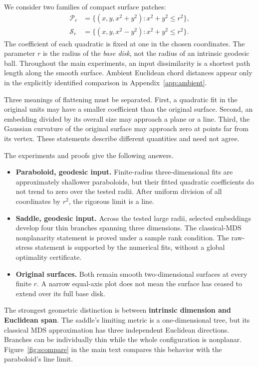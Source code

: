\documentclass[11pt]{article}
\theoremstyle{remark}\newtheorem{remark}[proposition]{Remark}
\begin{document}
We consider two families of compact surface patches:
\begin{align}
 \mathcal P_r&=\{(x,y,x^2+y^2):x^2+y^2\le r^2\},\\
 \mathcal S_r&=\{(x,y,x^2-y^2):x^2+y^2\le r^2\}.
\end{align}
The coefficient of each quadratic is fixed at one in the chosen coordinates.
The parameter $r$ is the radius of the \emph{base disk}, not the radius of an
intrinsic geodesic ball. Throughout the main experiments, an input
dissimilarity is a shortest path length along the smooth surface. Ambient
Euclidean chord distances appear only in the explicitly identified comparison
in Appendix~\ref{app:ambient}.

Three meanings of flattening must be separated. First, a quadratic fit in the
original units may have a smaller coefficient than the original surface.
Second, an embedding divided by its overall size may approach a plane or a
line. Third, the Gaussian curvature of the original surface may approach zero
at points far from its vertex. These statements describe different quantities
and need not agree.

The experiments and proofs give the following answers.
\begin{itemize}
 \item \textbf{Paraboloid, geodesic input.} Finite-radius three-dimensional
 fits are approximately shallower paraboloids, but their fitted quadratic
 coefficients do not trend to zero over the tested radii. After uniform
 division of all coordinates by $r^2$, the rigorous limit is a line.
 \item \textbf{Saddle, geodesic input.} Across the tested large radii, selected
 embeddings develop four thin branches spanning three dimensions. The classical-MDS nonplanarity
 statement is proved under a sample rank condition. The raw-stress statement
 is supported by the numerical fits, without a global optimality certificate.
 \item \textbf{Original surfaces.} Both remain smooth two-dimensional surfaces
 at every finite $r$. A narrow equal-axis plot does not mean the surface has
 ceased to extend over its full base disk.
\end{itemize}

The strongest geometric distinction is between \textbf{intrinsic dimension
and Euclidean span}. The saddle's limiting metric is a one-dimensional tree,
but its classical MDS approximation has three independent Euclidean directions.
Branches can be individually thin while the whole configuration is nonplanar.
Figure~\ref{fig:scompare} in the main text compares this behavior with the
paraboloid's line limit.
\end{document}

